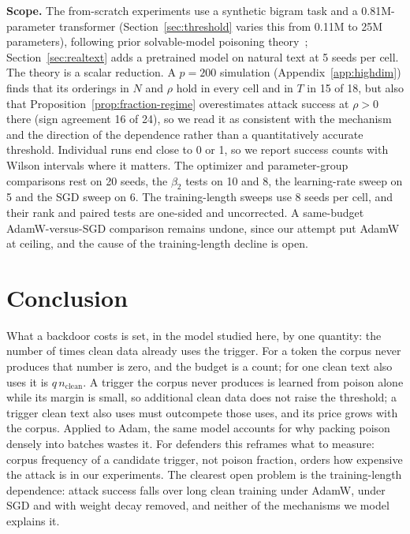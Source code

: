 \documentclass{article} %
\begin{document}
\textbf{Scope.} The from-scratch experiments use a synthetic bigram task and a 0.81M-parameter transformer (Section~\ref{sec:threshold} varies this from 0.11M to 25M parameters), following prior solvable-model poisoning
theory~\citep{linearpoisoning2025,glmbackdoor2026}; Section~\ref{sec:realtext} adds a pretrained
model on natural text at 5 seeds per cell. The theory is a scalar reduction. A $p=200$ simulation
(Appendix~\ref{app:highdim}) finds that its orderings in $N$ and $\rho$ hold in every cell and in $T$ in 15 of 18, but also that Proposition~\ref{prop:fraction-regime} overestimates attack success at $\rho>0$ there (sign agreement 16 of 24), so we read it as consistent with the mechanism and the direction of the dependence rather than a quantitatively accurate threshold. Individual runs end close to 0 or 1, so we report success counts with Wilson intervals
where it matters. The optimizer and parameter-group comparisons rest on 20 seeds, the $\beta_2$ tests on 10 and 8, the learning-rate sweep on 5 and the SGD sweep on 6. The training-length sweeps use 8 seeds per cell, and their rank and paired tests are one-sided and uncorrected. A same-budget AdamW-versus-SGD comparison remains undone, since our attempt put AdamW at ceiling, and the cause of the training-length decline is open.

\section{Conclusion}

What a backdoor costs is set, in the model studied here, by one quantity: the number of
times clean data already uses the trigger. For a token the corpus never produces that
number is zero, and the budget is a count; for one clean text also uses it is
$q\,n_{\text{clean}}$. A trigger the corpus
never produces is learned from poison alone while its margin is small, so additional
clean data does not raise the threshold; a trigger clean text also uses must outcompete
those uses, and its price grows with the corpus. Applied to Adam, the same model accounts for
why packing poison densely into batches wastes it. For defenders this reframes what to
measure: corpus frequency of a candidate trigger, not poison fraction, orders how expensive the attack is in our experiments. The clearest open problem is the training-length dependence: attack success falls over long clean training under AdamW, under SGD and with weight decay removed, and neither of the mechanisms we model explains it.
\end{document}
